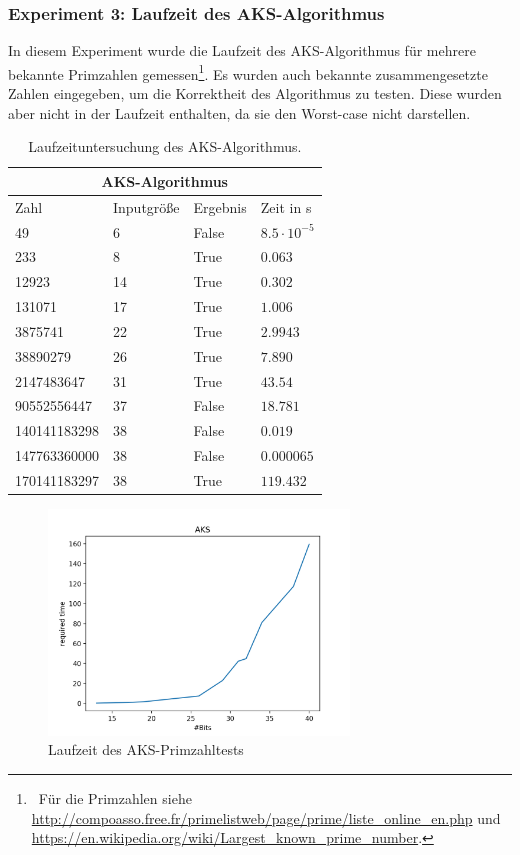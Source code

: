 \documentclass[12pt,oneside]{article}
\theoremstyle{remark}
\theoremstyle{definition}
\begin{document}
\newpage

\subsubsection{Experiment 3: Laufzeit des AKS-Algorithmus}
In diesem Experiment wurde die Laufzeit des AKS-Algorithmus für mehrere bekannte Primzahlen gemessen\footnote{$\,$ Für die Primzahlen siehe \url{http://compoasso.free.fr/primelistweb/page/prime/liste_online_en.php} und \url{https://en.wikipedia.org/wiki/Largest_known_prime_number}.}. Es wurden auch bekannte zusammengesetzte Zahlen eingegeben, um die Korrektheit des Algorithmus zu testen. Diese wurden aber nicht in der Laufzeit enthalten, da sie den Worst-case nicht darstellen.
\begin{table}[h!]
\centering
\begin{tabular}{ |p{3cm}||p{3cm}|p{3cm}|p{3cm}|  }
 \hline
 \multicolumn{4}{|c|}{AKS-Algorithmus} \\
 \hline
 Zahl & Inputgröße &Ergebnis&Zeit in s\\
 \hline
 49   & 6    &False&   $8.5 \cdot 10^{-5}$\\
 233&   8  & True   &$0.063$\\
 12923 &14 & True&  $0.302$\\
 131071    &17 & True&  $1.006$\\
 3875741& 22  & True   &$2.9943$\\
 38890279& 26  & True& $7.890$\\
 2147483647&   31  & True& $43.54$\\
 90552556447&   37  & False& $18.781$\\
 140141183298&   38  & False& $0.019$\\
 147763360000&   38  & False& $0.000065$\\
 170141183297& 38 & True& $119.432$\\
 \hline
\end{tabular}
 \caption{Laufzeituntersuchung des AKS-Algorithmus.}
\label{table:3}
\end{table}

\begin{figure}[h]
\includegraphics[width=8cm]{plots/aks.png}
\centering
\caption{Laufzeit des AKS-Primzahltests}
\end{figure}
\end{document}
